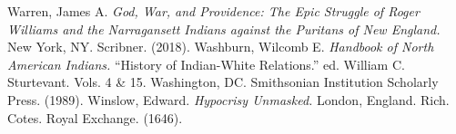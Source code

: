 \documentclass[sn-mathphys]{sn-jnl}%
\theoremstyle{thmstyleone}%
\theoremstyle{thmstyletwo}%
\theoremstyle{thmstylethree}%
\begin{document}
\begin{thebibliography}{1}
\smallskip
{} Warren, James A. {\em God, War, and Providence: The Epic Struggle of Roger Williams and the Narragansett Indians against the Puritans of New England.}  New York, NY. Scribner. (2018).
\smallskip
{} Washburn, Wilcomb E. {\em Handbook of North American Indians.} ``History of Indian-White Relations.'' ed. William C. Sturtevant. Vols. 4 \& 15. Washington, DC. Smithsonian Institution Scholarly Press. (1989).
\smallskip
{} Winslow, Edward. {\em Hypocrisy Unmasked.}  London, England. Rich. Cotes. Royal Exchange. (1646).

\end{thebibliography}
\end{document}
